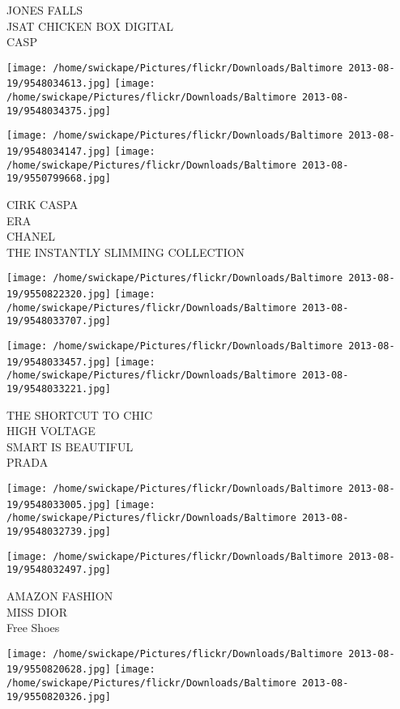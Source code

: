 \documentclass[10pt,letterpaper]{article}
\begin{document}
JONES FALLS\\
JSAT CHICKEN BOX DIGITAL\\
CASP
\pagebreak

\texttt{[image: /home/swickape/Pictures/flickr/Downloads/Baltimore 2013-08-19/9548034613.jpg]}
\texttt{[image: /home/swickape/Pictures/flickr/Downloads/Baltimore 2013-08-19/9548034375.jpg]}

\texttt{[image: /home/swickape/Pictures/flickr/Downloads/Baltimore 2013-08-19/9548034147.jpg]}
\texttt{[image: /home/swickape/Pictures/flickr/Downloads/Baltimore 2013-08-19/9550799668.jpg]}

CIRK CASPA\\
ERA\\
CHANEL\\
THE INSTANTLY SLIMMING COLLECTION
\pagebreak

\texttt{[image: /home/swickape/Pictures/flickr/Downloads/Baltimore 2013-08-19/9550822320.jpg]}
\texttt{[image: /home/swickape/Pictures/flickr/Downloads/Baltimore 2013-08-19/9548033707.jpg]}

\texttt{[image: /home/swickape/Pictures/flickr/Downloads/Baltimore 2013-08-19/9548033457.jpg]}
\texttt{[image: /home/swickape/Pictures/flickr/Downloads/Baltimore 2013-08-19/9548033221.jpg]}

THE SHORTCUT TO CHIC\\
HIGH VOLTAGE\\
SMART IS BEAUTIFUL\\
PRADA
\pagebreak

\texttt{[image: /home/swickape/Pictures/flickr/Downloads/Baltimore 2013-08-19/9548033005.jpg]}
\texttt{[image: /home/swickape/Pictures/flickr/Downloads/Baltimore 2013-08-19/9548032739.jpg]}

\vspace{0.25in}
\texttt{[image: /home/swickape/Pictures/flickr/Downloads/Baltimore 2013-08-19/9548032497.jpg]}

AMAZON FASHION\\
MISS DIOR\\
Free Shoes
\pagebreak

\texttt{[image: /home/swickape/Pictures/flickr/Downloads/Baltimore 2013-08-19/9550820628.jpg]}
\texttt{[image: /home/swickape/Pictures/flickr/Downloads/Baltimore 2013-08-19/9550820326.jpg]}
\end{document}
